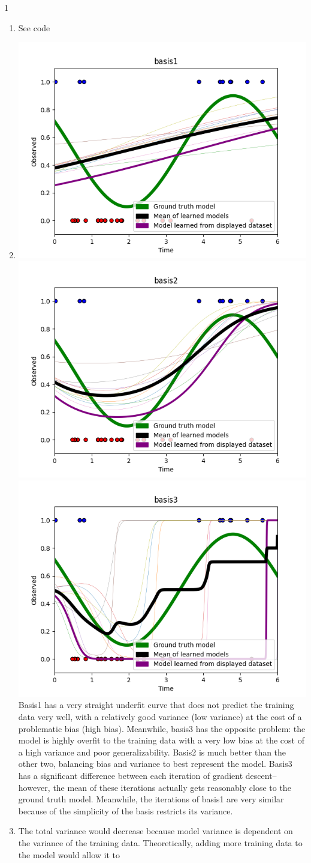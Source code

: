 \documentclass[submit]{harvardml}
\begin{document}
\newpage
\begin{sol}{}{1}
  \begin{enumerate}
    \item See code
    \item 
    \includegraphics[width=0.33\linewidth]{basis1.png}
    \includegraphics[width=0.33\linewidth]{basis2.png}
    \includegraphics[width=0.33\linewidth]{basis3.png}
    Basis1 has a very straight underfit curve that does
    not predict the training data very well, with a 
    relatively good variance (low variance)
    at the cost of a problematic bias (high bias). Meanwhile,
    basis3 has the opposite problem: the model is highly overfit
    to the training data with a very low bias
    at the cost of a high variance and poor generalizability.
    Basis2 is much better than the other two, balancing bias
    and variance to best represent the model. Basis3 has a significant
    difference between each iteration of gradient descent--however,
    the mean of these iterations actually gets reasonably close to
    the ground truth model. Meanwhile, the iterations of basis1
    are very similar because of the simplicity of the basis restricts
    its variance.
    \item The total variance would decrease because model variance
    is dependent on the variance of the training data. Theoretically,
    adding more training data to the model would allow it to

\end{enumerate}
\end{sol}
\end{document}
